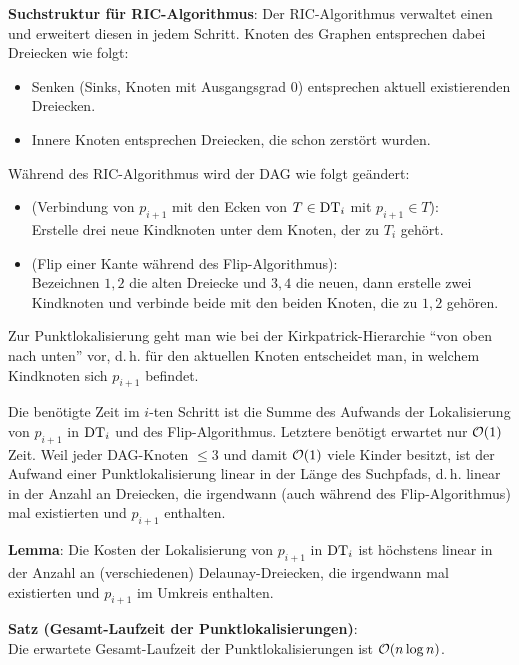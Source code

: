 \textbf{Suchstruktur für RIC-Algorithmus}:
Der RIC-Algorithmus verwaltet einen 
und erweitert diesen in jedem Schritt.
Knoten des Graphen entsprechen dabei Dreiecken wie folgt:
\begin{itemize}
    \item
    Senken (Sinks, Knoten mit Ausgangsgrad $0$) entsprechen aktuell existierenden Dreiecken.
    
    \item
    Innere Knoten entsprechen Dreiecken, die schon zerstört wurden.
\end{itemize}
Während des RIC-Algorithmus wird der DAG wie folgt geändert:
\begin{itemize}
    \item
    (Verbindung von $p_{i+1}$ mit den Ecken von $T \in \operatorname{DT}_i$ mit $p_{i+1} \in T$):\\
    Erstelle drei neue Kindknoten unter dem Knoten, der zu $T_i$ gehört.
    
    \item
    (Flip einer Kante während des Flip-Algorithmus):\\
    Bezeichnen $1, 2$ die alten Dreiecke und $3, 4$ die neuen,
    dann erstelle zwei Kindknoten und verbinde beide mit den beiden Knoten, die zu $1, 2$ gehören.
\end{itemize}

Zur Punktlokalisierung geht man wie bei der Kirkpatrick-Hierarchie "`von oben nach unten"' vor,
d.\,h. für den aktuellen Knoten entscheidet man, in welchem Kindknoten sich $p_{i+1}$ befindet.

\linie

Die benötigte Zeit im $i$-ten Schritt ist die Summe des Aufwands der Lokalisierung von $p_{i+1}$
in $\operatorname{DT}_i$ und des Flip-Algorithmus.
Letztere benötigt erwartet nur $\mathcal{O}(1)$ Zeit.
Weil jeder DAG-Knoten $\le 3$ und damit $\mathcal{O}(1)$ viele Kinder besitzt, ist der Aufwand einer
Punktlokalisierung linear in der Länge des Suchpfads, d.\,h. linear in der Anzahl an
Dreiecken, die irgendwann
(auch während des Flip-Algorithmus) mal existierten und $p_{i+1}$ enthalten.

\textbf{Lemma}:
Die Kosten der Lokalisierung von $p_{i+1}$ in $\operatorname{DT}_i$ ist höchstens linear in der Anzahl an
(verschiedenen) Delaunay-Dreiecken, die irgendwann mal existierten und $p_{i+1}$ im Umkreis
enthalten.

\textbf{Satz (Gesamt-Laufzeit der Punktlokalisierungen)}:\\
Die erwartete Gesamt-Laufzeit der Punktlokalisierungen ist $\mathcal{O}(n \log n)$.

